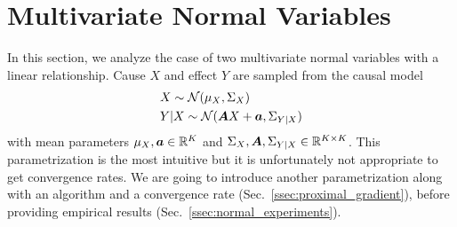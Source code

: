 \section{{Multivariate Normal Variables}}
In this section, we analyze the case of two multivariate normal variables with a linear relationship.
Cause $X$ and effect $Y$ are sampled from the causal model
\begin{align}
    \label{eq:normal_mean_model}
    & X \sim \cN(\mu_X, \Sigma_X)
   \\ %
    & Y|X \sim \cN(\mA X + \va, \Sigma_{Y|X})
\end{align}
with mean parameters $\mu_X, {\bm{a}} \in \mathbb{R}^K$ and $\Sigma_X, {\bm{A}}, \Sigma_{Y|X} \in \mathbb{R}^{K\times K}$.
This parametrization is the most intuitive but it is unfortunately not appropriate to get convergence rates.
We are going to introduce another parametrization  
along with an algorithm and a convergence rate (Sec.~\ref{ssec:proximal_gradient}),
before providing empirical results (Sec.~\ref{ssec:normal_experiments}).


